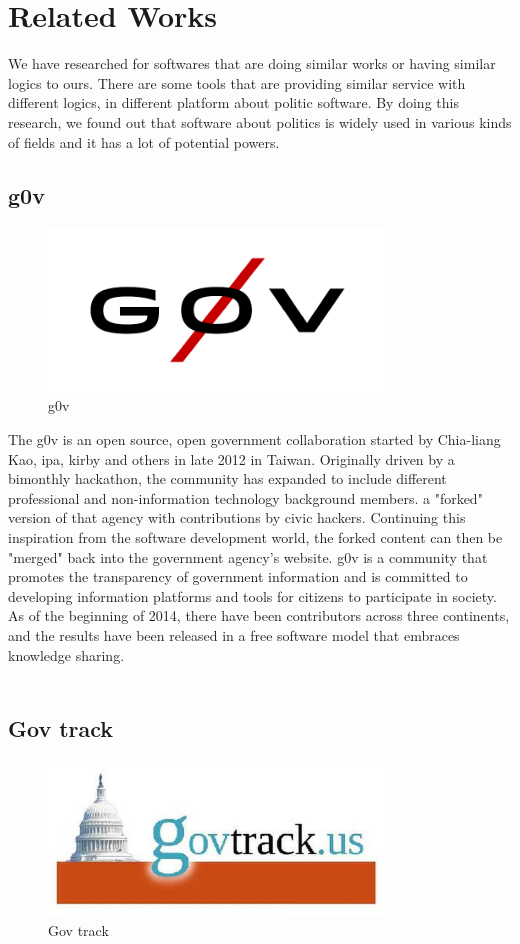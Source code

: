 \documentclass[conference]{IEEEtran}
\begin{document}
\section{Related Works}
We have researched for softwares that are doing similar works or having similar logics to ours. There are some tools that are providing similar service with different logics, in different platform about politic software. By doing this research, we found out that software about politics is widely used in various kinds of fields and it has a lot of potential powers. 

\subsection{g0v}
  \begin{figure}[htbp]
	\centerline{\includegraphics[width=89mm, scale=0.5]{fig/g0v.png}}
	\caption{g0v}
	\label{fig}
	\end{figure}
The g0v is an open source, open government collaboration started by Chia-liang Kao, ipa, kirby and others in late 2012 in Taiwan. Originally driven by a bimonthly hackathon, the community has expanded to include different professional and non-information technology background members. a "forked" version of that agency with contributions by civic hackers. Continuing this inspiration from the software development world, the forked content can then be "merged" back into the government agency's website. g0v is a community that promotes the transparency of government information and is committed to developing information platforms and tools for citizens to participate in society. As of the beginning of 2014, there have been contributors across three continents, and the results have been released in a free software model that embraces knowledge sharing.
\\
\\

\subsection{Gov track}
  \begin{figure}[htbp]
	\centerline{\includegraphics[width=89mm, scale=0.5]{fig/gov_track.jpg}}
	\caption{Gov track}
	\label{fig}
	\end{figure}
	
\end{document}

